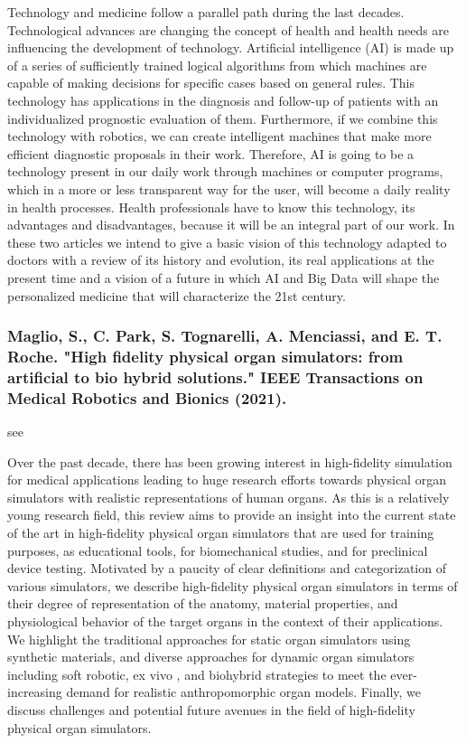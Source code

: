 \documentclass[conference]{IEEEtran}
\begin{document}
Technology and medicine follow a parallel path during the last decades. Technological advances are changing the concept of health and health needs are influencing the development of technology. Artificial intelligence (AI) is made up of a series of sufficiently trained logical algorithms from which machines are capable of making decisions for specific cases based on general rules. This technology has applications in the diagnosis and follow-up of patients with an individualized prognostic evaluation of them. Furthermore, if we combine this technology with robotics, we can create intelligent machines that make more efficient diagnostic proposals in their work. Therefore, AI is going to be a technology present in our daily work through machines or computer programs, which in a more or less transparent way for the user, will become a daily reality in health processes. Health professionals have to know this technology, its advantages and disadvantages, because it will be an integral part of our work. In these two articles we intend to give a basic vision of this technology adapted to doctors with a review of its history and evolution, its real applications at the present time and a vision of a future in which AI and Big Data will shape the personalized medicine that will characterize the 21st century.

\medskip
\subsubsection{Maglio, S., C. Park, S. Tognarelli, A. Menciassi, and E. T. Roche. "High fidelity physical organ simulators: from artificial to bio hybrid solutions." IEEE Transactions on Medical Robotics and Bionics (2021).}
see \cite{maglio2021high}

Over the past decade, there has been growing interest in high-fidelity simulation for medical applications leading to huge research efforts towards physical organ simulators with realistic representations of human organs. As this is a relatively young research field, this review aims to provide an insight into the current state of the art in high-fidelity physical organ simulators that are used for training purposes, as educational tools, for biomechanical studies, and for preclinical device testing. Motivated by a paucity of clear definitions and categorization of various simulators, we describe high-fidelity physical organ simulators in terms of their degree of representation of the anatomy, material properties, and physiological behavior of the target organs in the context of their applications. We highlight the traditional approaches for static organ simulators using synthetic materials, and diverse approaches for dynamic organ simulators including soft robotic, ex vivo , and biohybrid strategies to meet the ever-increasing demand for realistic anthropomorphic organ models. Finally, we discuss challenges and potential future avenues in the field of high-fidelity physical organ simulators.
\end{document}
